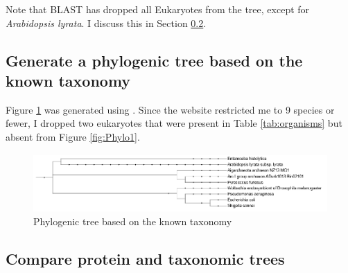 \documentclass[]{article}
\begin{document}
Note that BLAST has dropped all Eukaryotes  from the tree, except for  \textit{Arabidopsis lyrata}. I discuss this in Section \ref{sect:compare}.

\subsection{Generate a phylogenic tree based on the known taxonomy}

Figure \ref{fig:Phylo2} was generated using \cite{biobyte2019phylot}. Since the website restricted me to 9 species or fewer, I dropped two eukaryotes that were present in Table \ref{tab:organisms} but absent from Figure \ref{fig:Phylo1}.

\begin{figure}[H]
	\caption{Phylogenic tree based on the known taxonomy}\label{fig:Phylo2}
	\includegraphics[width=\textwidth]{Phylo2}
\end{figure}

\subsection{Compare protein and taxonomic trees}\label{sect:compare}
\end{document}
